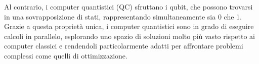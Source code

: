 Al contrario, i computer quantistici (QC) sfruttano i qubit, che possono 
trovarsi in una sovrapposizione di stati, rappresentando simultaneamente 
sia 0 che 1. Grazie a questa proprietà unica, i computer quantistici 
sono in grado di eseguire calcoli in parallelo, esplorando uno spazio 
di soluzioni molto più vasto rispetto ai computer classici e rendendoli 
particolarmente adatti per affrontare problemi complessi come quelli di 
ottimizzazione.
